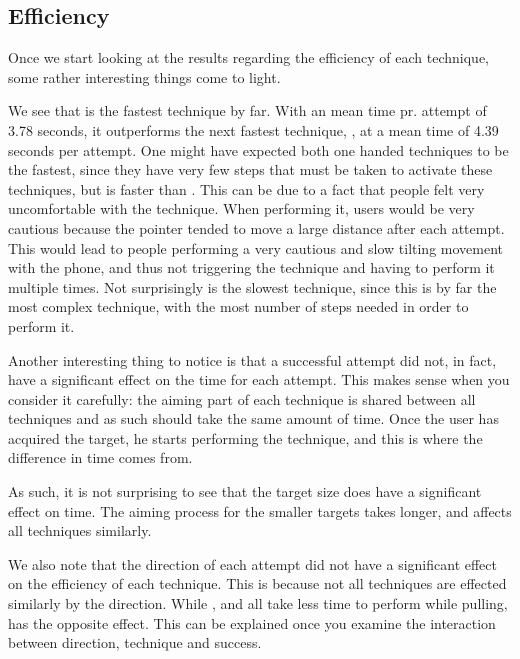 \subsection{Efficiency}

Once we start looking at the results regarding the efficiency of each technique, some rather interesting things come to light.

We see that \swipe is the fastest technique by far.
With an mean time pr. attempt of 3.78 seconds, it outperforms the next fastest technique, \throw, at a mean time of 4.39 seconds per attempt. 
One might have expected both one handed techniques to be the fastest, since they have very few steps that must be taken to activate these techniques, but \throw is faster than \tilt. 
This can be due to a fact that people felt very uncomfortable with the \tilt technique.
When performing it, users would be very cautious because the pointer tended to move a large distance after each attempt.
This would lead to people performing a very cautious and slow tilting movement with the phone, and thus not triggering the technique and having to perform it multiple times. 
Not surprisingly \grab is the slowest technique, since this is by far the most complex technique, with the most number of steps needed in order to perform it.

Another interesting thing to notice is that a successful attempt did not, in fact, have a significant effect on the time for each attempt.
This makes sense when you consider it carefully: the aiming part of each technique is shared between all techniques and as such should take the same amount of time.
Once the user has acquired the target, he starts performing the technique, and this is where the difference in time comes from.

As such, it is not surprising to see that the target size does have a significant effect on time.
The aiming process for the smaller targets takes longer, and affects all techniques similarly.

We also note that the direction of each attempt did not have a significant effect on the efficiency of each technique. 
This is because not all techniques are effected similarly by the direction. 
While \swipe, \throw and \tilt all take less time to perform while pulling, \grab has the opposite effect.
This can be explained once you examine the interaction between direction, technique and success.


